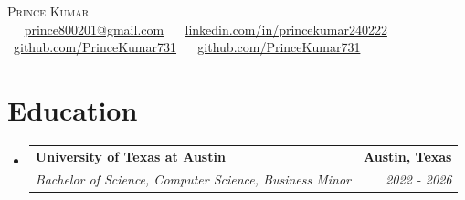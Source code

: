 \documentclass[letterpaper,11pt]{article}
\makeatletter
\newcommand{\resumeSubheading}[4]{
  \vspace{-2pt}\item
    \begin{tabular*}{1.0\textwidth}[t]{l@{\extracolsep{\fill}}r}
      \textbf{#1} & \textbf{\small #2} \\
      \textit{\small#3} & \textit{\small #4} \\
    \end{tabular*}\vspace{-7pt}
}
\newcommand{\resumeSubHeadingListStart}{\begin{itemize}[leftmargin=0.0in, label={}]}
\newcommand{\resumeSubHeadingListEnd}{\end{itemize}}
\makeatother
\begin{document}

\begin{center}
	{\LARGE \scshape Prince Kumar} \\ \vspace{1pt} 
	\small \raisebox{-0.1\height}~ \raisebox{-0.2\height}\faEnvelope\ \href{mailto:prince800201@gmail.com}{prince800201@gmail.com} ~ 
	\raisebox{-0.2\height}\faLinkedin\ \href{https://www.linkedin.com/in/princekumar240222}{linkedin.com/in/princekumar240222} ~
	\raisebox{-0.2\height}\faGithub\ \href{https://github.com/PrinceKumar731}{github.com/PrinceKumar731} ~
    \raisebox{-0.2\height}\faCode\ \href{https://github.com/PrinceKumar731}{github.com/PrinceKumar731}
	\vspace{-8pt}
\end{center}


\section{Education}
\resumeSubHeadingListStart
\resumeSubheading
{University of Texas at Austin}{Austin, Texas}
{Bachelor of Science, Computer Science, Business Minor}{2022 - 2026}
\resumeSubHeadingListEnd
\end{document}
